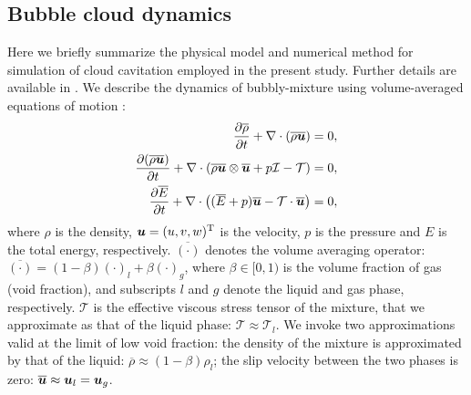 \documentclass{jfm}
\def\vector#1{\mbox{\boldmath $#1$}}
\def\tensor#1{\mathcal #1}
\begin{document}
\subsection{Bubble cloud dynamics}
\label{section:gov_eqn}
Here we briefly summarize the physical model and numerical method for simulation of cloud cavitation employed in the present study. Further details are available in \citet{Maeda17}.
We describe the dynamics of bubbly-mixture using volume-averaged equations of motion \citep{Caflisch85,Commander89}:
\begin{align}
\frac{\partial \overline\rho}{\partial
t}+\nabla\cdot(\overline{\rho\vector{u}})
&=0,\label{eqn:vaeqn_ma}\\
\frac{\partial (\overline{\rho\vector{u}})}{\partial t} + \nabla\cdot
(\overline{\rho\vector{u}}\otimes\overline{\vector{u}}+p\tensor{I}
-\tensor{T})
&=0,\label{eqn:vaeqn_mo}\\
\frac{\partial \overline{E}}{\partial t} + \nabla\cdot
\left((\overline{E}+p)\overline{\vector{u}}
-\tensor{T}\cdot\overline{\vector{u}}\right)
&=0\label{eqn:vaeqn_e},
\end{align}
where $\rho$ is the density, $\vector{u}=(u,v,w)^{\mathrm{T}}$ is the velocity,
$p$ is the pressure and $E$ is the total energy, respectively.
$\overline{(\cdot)}$ denotes the volume averaging operator:
$\overline{(\cdot)}=(1-\beta)(\cdot)_l+\beta(\cdot)_g$,
where $\beta\in[0,1)$ is the volume fraction of gas (void fraction), and
subscripts $l$ and $g$ denote the liquid and gas phase, respectively.
$\tensor{T}$ is the effective viscous stress tensor of the mixture, that we approximate as that of the liquid phase: $\tensor{T}\approx\tensor{T}_l$.
We invoke two approximations valid at the limit of low void fraction: the density of the mixture is approximated by that of the liquid:
$\overline\rho\approx(1-\beta)\rho_l$; the slip velocity between the two phases is zero:
$\overline{\vector{u}}\approx\vector{u}_l=\vector{u}_g$.
\end{document}
